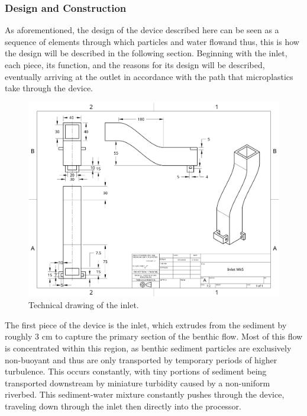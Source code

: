 \documentclass[fleqn,10pt]{SelfArx} %
\begin{document}
	\subsubsection{Design and Construction}
		As aforementioned, the design of the device described here can be seen as a sequence of elements through which particles and water flow\textemdash and thus, this is how the design will be described in the following section. Beginning with the inlet, each piece, its function, and the reasons for its design will be described, eventually arriving at the outlet in accordance with the path that microplastics take through the device. 
		\begin{figure}[h]
			\centering
			\includegraphics[width=1\linewidth]{Figures/TechInlet}
			\caption[Inlet Tech. Drawing]{Technical drawing of the inlet.}
			\label{fig:techinlet}
		\end{figure}
			The first piece of the device is the inlet, which extrudes from the sediment by roughly 3 cm to capture the primary section of the benthic flow. Most of this flow is concentrated within this region, as benthic sediment particles are exclusively non-buoyant and thus are only transported by temporary periods of higher turbulence. This occurs constantly, with tiny portions of sediment being transported downstream by miniature turbidity caused by a non-uniform riverbed. This sediment-water mixture constantly pushes through the device, traveling down through the inlet then directly into the processor. 
\end{document}

